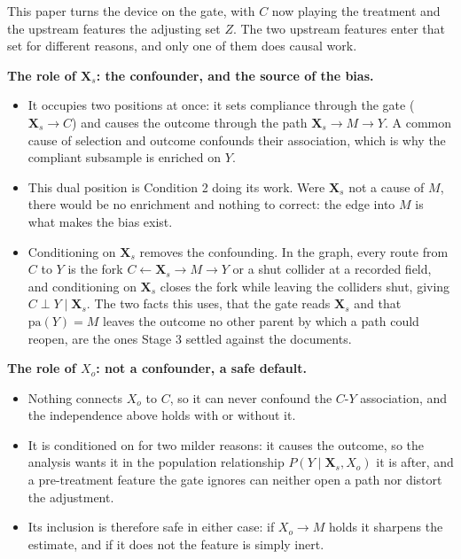 This paper turns the device on the gate, with $C$ now playing the treatment and the upstream features the adjusting set $Z$. The two upstream features enter that set for different reasons, and only one of them does causal work.

\textbf{The role of $\mathbf{X}_s$: the confounder, and the source of the bias.}

\begin{itemize}
  \item It occupies two positions at once: it sets compliance through the gate ($\mathbf{X}_s \to C$) and causes the outcome through the path $\mathbf{X}_s \to M \to Y$. A common cause of selection and outcome confounds their association, which is why the compliant subsample is enriched on $Y$.
  \item This dual position is Condition 2 doing its work. Were $\mathbf{X}_s$ not a cause of $M$, there would be no enrichment and nothing to correct: the edge into $M$ is what makes the bias exist.
  \item Conditioning on $\mathbf{X}_s$ removes the confounding. In the graph, every route from $C$ to $Y$ is the fork $C \leftarrow \mathbf{X}_s \to M \to Y$ or a shut collider at a recorded field, and conditioning on $\mathbf{X}_s$ closes the fork while leaving the colliders shut, giving $C \perp Y \mid \mathbf{X}_s$. The two facts this uses, that the gate reads $\mathbf{X}_s$ and that $\mathrm{pa}(Y) = M$ leaves the outcome no other parent by which a path could reopen, are the ones Stage 3 settled against the documents.
\end{itemize}

\textbf{The role of $X_o$: not a confounder, a safe default.}

\begin{itemize}
  \item Nothing connects $X_o$ to $C$, so it can never confound the $C$-$Y$ association, and the independence above holds with or without it.
  \item It is conditioned on for two milder reasons: it causes the outcome, so the analysis wants it in the population relationship $P(Y \mid \mathbf{X}_s, X_o)$ it is after, and a pre-treatment feature the gate ignores can neither open a path nor distort the adjustment.
  \item Its inclusion is therefore safe in either case: if $X_o \to M$ holds it sharpens the estimate, and if it does not the feature is simply inert.
\end{itemize}

